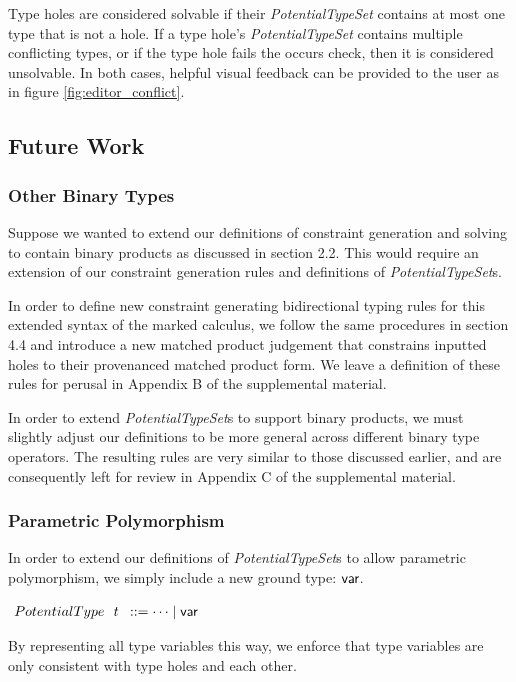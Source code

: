 Type holes are considered solvable if their \textit{PotentialTypeSet} contains at most one type that is not a hole. If a type hole's \textit{PotentialTypeSet} contains multiple conflicting types, or if the type hole fails the occurs check, then it is considered unsolvable. In both cases, helpful visual feedback can be provided to the user as in figure \ref{fig:editor_conflict}.

\subsection{Future Work}
\subsubsection{Other Binary Types}
Suppose we wanted to extend our definitions of constraint generation and solving to contain binary products as discussed in section 2.2. This would require an extension of our constraint generation rules and definitions of \emph{PotentialTypeSet}s. 

In order to define new constraint generating bidirectional typing rules for this extended syntax of the marked calculus, we follow the same procedures in section 4.4 and introduce a new matched product judgement that constrains inputted holes to their provenanced matched product form. We leave a definition of these rules for perusal in Appendix B of the supplemental material.

In order to extend \emph{PotentialTypeSet}s to support binary products, we must slightly adjust our definitions to be more general across different binary type operators. The resulting rules are very similar to those discussed earlier, and are consequently left for review in Appendix C of the supplemental material.

\subsubsection{Parametric Polymorphism}
In order to extend our definitions of \emph{PotentialTypeSet}s to allow parametric polymorphism, we simply include a new ground type: ${\normalfont\textsf{var}}$.
\begin{center}
$\arraycolsep=4pt\begin{array}{lll}
PotentialType~~ t & ::= 
  \dots \mid \TVar
\end{array}$
\end{center}
By representing all type variables this way, we enforce that type variables are only consistent with type holes and each other. 

